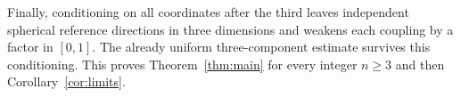 \documentclass[11pt]{article}
\theoremstyle{definition}
\theoremstyle{remark}
\numberwithin{equation}{section}
\begin{document}
Finally, conditioning on all coordinates after the third leaves
independent spherical reference directions in three dimensions and
weakens each coupling by a factor in $[0,1]$. The already uniform
three-component estimate survives this conditioning. This proves
Theorem~\ref{thm:main} for every integer $n\ge3$ and then
Corollary~\ref{cor:limits}.





{\raggedright}
\end{document}
